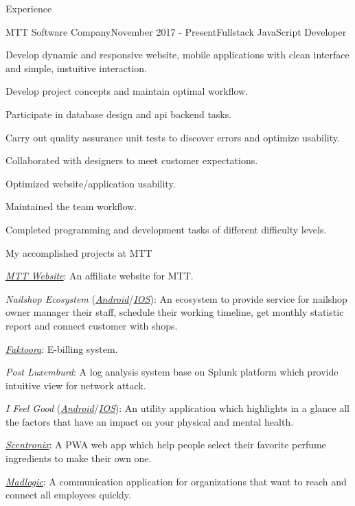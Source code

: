 \documentclass{resume}
\begin{document}
  \begin{rSection}{Experience}
    \begin{rSubsection}{MTT Software Company}{November 2017 - Present}{Fullstack JavaScript Developer}{}
      \item Develop dynamic and responsive website, mobile applications with clean interface and simple, instuitive interaction.
      \item Develop project concepts and maintain optimal workflow.
      \item Participate in database design and api backend tasks.
      \item Carry out quality assurance unit tests to discover errors and optimize usability.
      \item Collaborated with designers to meet customer expectations.
      \item Optimized website/application usability.
      \item Maintained the team workflow.
      \item Completed programming and development tasks of different difficulty levels.
    \end{rSubsection}

    \begin{rSubsection}{}{}{My accomplished projects at MTT}{}
      \item \href{https://mttjsc.com/}{\emph{MTT Website}}: An affiliate website for MTT.
      \item \emph{Nailshop Ecosystem} (\href{https://play.google.com/store/apps/developer?id=MTT+Software+Company+LTD/}{\emph{Android}}/\href{https://apps.apple.com/us/developer/mttjsc/id1250334932}{\emph{IOS}}): 
      An ecosystem to provide service for nailshop owner manager their
      staff, schedule their working timeline, get monthly statistic report and connect customer with shops.
      \item \href{http://app.faktoora.com}{\emph{Faktoora}}: E-billing system.
      \item \emph{Post Luxemburd}: A log analysis system base on Splunk platform which provide intuitive view for network attack.
      \item \emph{I Feel Good} (\href{https://play.google.com/store/apps/details?id=com.ifg_mobile}{\emph{Android}}/\href{}{\emph{IOS}}): 
      An utility application which highlights in a glance all the factors that have an impact on your physical and mental health.
      \item \href{https://app.scnt.me/}{\emph{Scentronix}}: A PWA web app which help people select their favorite perfume ingredients to make their own one.
      \item \href{https://www.madlogic.nl/magic/}{\emph{Madlogic}}: A communication application for organizations that want to reach and connect all employees quickly.
    \end{rSubsection}
  

\end{rSection}
\end{document}
